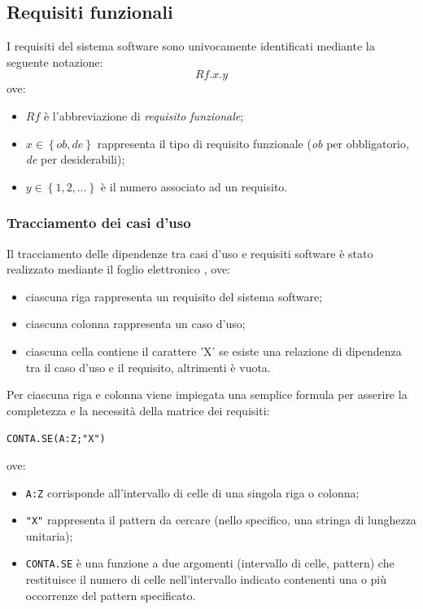 \documentclass[11pt,a4paper,headsepline,hidelinks]{scrreprt} %
\begin{document}
	\subsection{Requisiti funzionali} I requisiti del sistema software sono univocamente identificati mediante la seguente notazione:
	$$Rf.x.y$$
	ove:
	\begin{itemize}
		\item $Rf$ è l'abbreviazione di \textit{requisito funzionale};
		\item $x \in \left\{ob,de\right\}$ rappresenta il tipo di requisito funzionale (\textit{ob} per obbligatorio, \textit{de} per desiderabili);
		\item $y \in \left\{1,2,\ldots\right\}$ è il numero associato ad un requisito.
	\end{itemize}
	
	\subsubsection{Tracciamento dei casi d'uso}
	Il tracciamento delle dipendenze tra casi d'uso e requisiti software è stato realizzato mediante il foglio elettronico , ove:
	\begin{itemize}
	   \item ciascuna riga rappresenta un requisito del sistema software;
	   \item ciascuna colonna rappresenta un caso d'uso;
	   \item ciascuna cella contiene il carattere 'X' se esiste una relazione di dipendenza tra il caso d'uso e il requisito, altrimenti è vuota.
	 \end{itemize}
	 
  Per ciascuna riga e colonna viene impiegata una semplice formula per asserire la completezza e la necessità della matrice dei requisiti:  
  \begin{center}
    \texttt{CONTA.SE(A:Z;"X")}   
  \end{center}
  ove:
  \begin{itemize}
    \item \texttt{A:Z} corrisponde all'intervallo di celle di una singola riga o colonna;
    \item \texttt{"X"} rappresenta il pattern da cercare (nello specifico, una stringa di lunghezza unitaria);
    \item \texttt{CONTA.SE} è una funzione a due argomenti (intervallo di celle, pattern) che restituisce il numero di celle nell'intervallo indicato contenenti una o più occorrenze del pattern specificato.
  \end{itemize}
  
\end{document}
